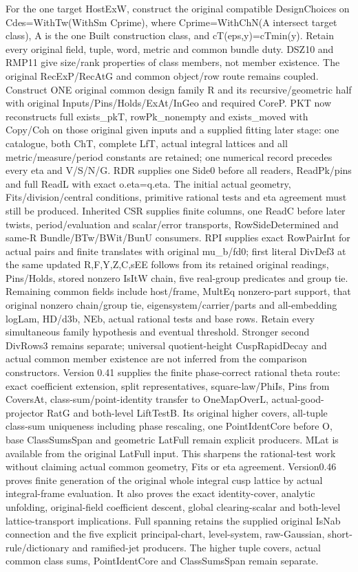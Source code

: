 \documentclass[11pt,a4paper]{article}
\numberwithin{equation}{section}
\theoremstyle{remark}\newtheorem{remark}[theorem]{Remark}
\begin{document}
For the one target HostExW, construct the original compatible DesignChoices on Cdes=WithTw(WithSm Cprime), where Cprime=WithChN(A intersect target class), A is the one Built construction class, and cT(eps,y)=cTmin(y). Retain every original field, tuple, word, metric and common bundle duty. DSZ10 and RMP11 give size/rank properties of class members, not member existence. The original RecExP/RecAtG and common object/row route remains coupled. Construct ONE original common design family R and its recursive/geometric half with original Inputs/Pins/Holds/ExAt/InGeo and required CoreP. PKT now reconstructs full exists\_\allowbreak pkT, rowPk\_\allowbreak nonempty and exists\_\allowbreak moved with Copy/Coh on those original given inputs and a supplied fitting later stage: one catalogue, both ChT, complete LfT, actual integral lattices and all metric/measure/period constants are retained; one numerical record precedes every eta and V/S/N/G. RDR supplies one Side0 before all readers, ReadPk/pins and full ReadL with exact o.eta=q.eta. The initial actual geometry, Fits/division/central conditions, primitive rational tests and eta agreement must still be produced. Inherited CSR supplies finite columns, one ReadC before later twists, period/evaluation and scalar/error transports, RowSideDetermined and same-R Bundle/BTw/BWit/BunU consumers. RPI supplies exact RowPairInt for actual pairs and finite translates with original mu\_\allowbreak b/fd0; first literal DivDef3 at the same updated R,F,Y,Z,C,sEE follows from its retained original readings, Pins/Holds, stored nonzero IsItW chain, five real-group predicates and group tie. Remaining common fields include host/frame, MultEq nonzero-part support, that original nonzero chain/group tie, eigensystem/carrier/parts and all-embedding logLam, HD/d3b, NEb, actual rational tests and base rows. Retain every simultaneous family hypothesis and eventual threshold. Stronger second DivRows3 remains separate; universal quotient-height CuspRapidDecay and actual common member existence are not inferred from the comparison constructors. Version 0.41 supplies the finite phase-correct rational theta route: exact coefficient extension, split representatives, square-law/PhiIs, Pins from CoversAt, class-sum/point-identity transfer to OneMapOverL, actual-good-projector RatG and both-level LiftTestB. Its original higher covers, all-tuple class-sum uniqueness including phase rescaling, one PointIdentCore before O, base ClassSumsSpan and geometric LatFull remain explicit producers. MLat is available from the original LatFull input. This sharpens the rational-test work without claiming actual common geometry, Fits or eta agreement. Version0.46 proves finite generation of the original whole integral cusp lattice by actual integral-frame evaluation. It also proves the exact identity-cover, analytic unfolding, original-field coefficient descent, global clearing-scalar and both-level lattice-transport implications. Full spanning retains the supplied original IsNab connection and the five explicit principal-chart, level-system, raw-Gaussian, short-rule/dictionary and ramified-jet producers. The higher tuple covers, actual common class sums, PointIdentCore and ClassSumsSpan remain separate.
\end{document}

